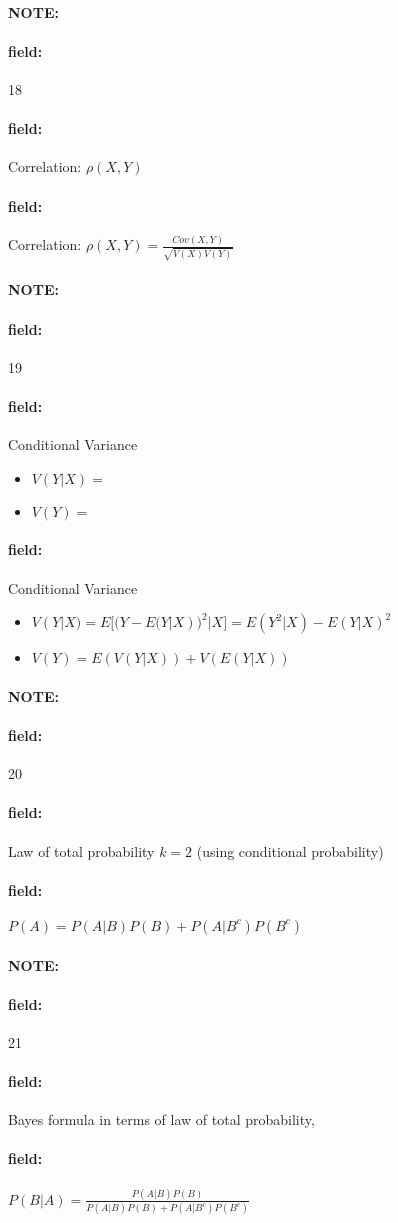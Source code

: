 \documentclass[12pt]{article}
\newenvironment{note}{\paragraph{NOTE:}}{}
\newenvironment{field}{\paragraph{field:}}{}
\begin{document}
\begin{note}
  \begin{field}
    \tiny 18
  \end{field}
  \begin{field}
    Correlation: $\rho(X,Y)$
  \end{field}
  \begin{field}
    Correlation: $\rho(X,Y) = \frac{Cov(X,Y)}{\sqrt{V(X)V(Y)}}$
  \end{field}
\end{note}



\begin{note}
  \begin{field}
    \tiny 19
  \end{field}
  \begin{field}
    Conditional Variance
    \begin{itemize}
      \item $V(Y|X) = $
      \item $V(Y) = $
    \end{itemize}
  \end{field}
  \begin{field}
    Conditional Variance
    \begin{itemize}
      \item $V(Y|X) = E\big[(Y - E(Y|X))^2|X\big] = E(Y^2|X) - E(Y|X)^2$
      \item $V(Y) = E(V(Y|X)) + V(E(Y|X))$
    \end{itemize}
  \end{field}
\end{note}


\begin{note}
  \begin{field}
    \tiny 20
  \end{field}
  \begin{field}
    Law of total probability $k=2$ (using conditional probability)
  \end{field}
  \begin{field}
    $P(A) = P(A|B)P(B) + P(A|B^c)P(B^c)$

  \end{field}
\end{note}

\begin{note}
  \begin{field}
    \tiny 21
  \end{field}
  \begin{field}
    Bayes formula in terms of law of total probability,
  \end{field}
  \begin{field}
    $P(B|A) = \frac{P(A|B)P(B)}{P(A|B)P(B) + P(A|B^c)P(B^c)}$
  \end{field}
\end{note}
\end{document}
